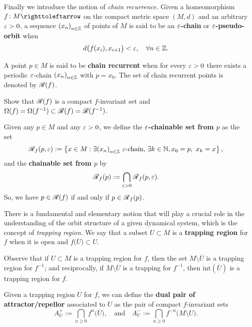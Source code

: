 Finally we introduce the notion of \emph{chain recurrence.} Given a homeomorphism $f\colon M\carr$ on the compact metric space $(M,d)$ and an arbitrary $\varepsilon>0$, a sequence ${(x_{n})}_{n\in\mathbb{Z}}$ of points of $M$ is said to be an \textbf{$\varepsilon$-chain} or \textbf{$\varepsilon$-pseudo-orbit} when
\begin{displaymath}
  d\big(f(x_{i}),x_{i+1}\big)<\varepsilon,\quad\forall n\in\mathbb{Z}.
\end{displaymath}

A point $p\in M$ is said to be \textbf{chain recurrent} when for every $\varepsilon>0$ there exists a periodic $\varepsilon$-chain ${(x_{n})}_{n\in\mathbb{Z}}$ with $p=x_{0}$. The set of chain recurrent points is denoted by $\mathscr{R{}}(f)$.


\begin{exercise}
  Show that $\mathscr{R{}}(f)$ is a compact $f$-invariant set and $\Omega(f)=\Omega(f^{-1})\subset\mathscr{R{}}(f)=\mathscr{R{}}(f^{-1})$.
\end{exercise}

Given any $p\in M$ and any $\varepsilon>0$, we define the \textbf{$\varepsilon$-chainable set from $p$} as the set
\begin{displaymath}
  \mathscr{R{}}_{f}(p,\varepsilon):=\left\{x\in M : \exists {(x_{n})}_{n\in\mathbb{Z}}\ \varepsilon\text{-chain, } \exists k\in\mathbb{N}, x_{0}=p,\ x_{k}=x\right\},
\end{displaymath}
and the \textbf{chainable set from $p$} by
\begin{displaymath}
  \mathscr{R{}}_{f}(p):=\bigcap_{\varepsilon>0}\mathscr{R{}}_{f}(p,\varepsilon).
\end{displaymath}
So, we have $p\in\mathscr{R{}}(f)$ if and only if $p\in\mathscr{R{}}_{f}(p)$.

There is a fundamental and elementary notion that will play a crucial role in the understanding of the orbit structure of a given dynamical system, which is the concept of \emph{trapping region.} We say that a subset $U\subset M$ is a \textbf{trapping region} for $f$ when it is open and $f\big(\overline{U}\big)\subset U$.

Observe that if $U\subset M$ is a trapping region for $f$, then the set $M\setminus\overline{U}$ is a trapping region for $f^{-1}$; and reciprocally, if $M\setminus\overline{U}$ is a trapping for $f^{-1}$, then $\mathrm{int}(\overline{U})$ is a trapping region for $f$.

Given a trapping region $U$ for $f$, we can define the \textbf{dual pair of attractor/repellor} associated to $U$ as the pair of compact $f$-invariant sets
\begin{displaymath}
  A_{U}^+:=\bigcap_{n\geq 0} f^{n}\big(\overline{U}\big), \quad\text{and}\quad A_{U}^-:=\bigcap_{n\geq 0} f^{-n}\big(M\setminus U\big).
\end{displaymath}


